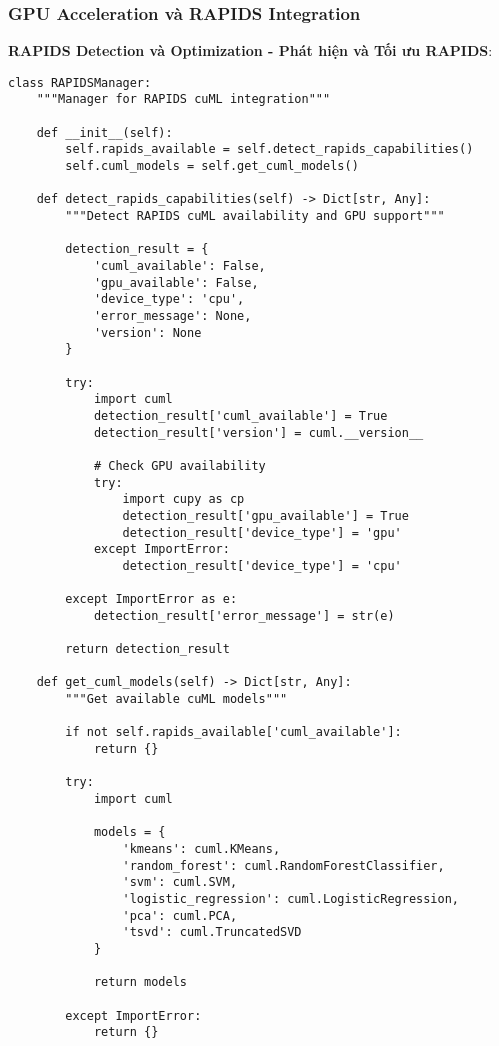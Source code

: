 \subsubsection{GPU Acceleration và RAPIDS Integration}

\textbf{RAPIDS Detection và Optimization - Phát hiện và Tối ưu RAPIDS}:

\begin{verbatim}
class RAPIDSManager:
    """Manager for RAPIDS cuML integration"""
    
    def __init__(self):
        self.rapids_available = self.detect_rapids_capabilities()
        self.cuml_models = self.get_cuml_models()
        
    def detect_rapids_capabilities(self) -> Dict[str, Any]:
        """Detect RAPIDS cuML availability and GPU support"""
        
        detection_result = {
            'cuml_available': False,
            'gpu_available': False,
            'device_type': 'cpu',
            'error_message': None,
            'version': None
        }
        
        try:
            import cuml
            detection_result['cuml_available'] = True
            detection_result['version'] = cuml.__version__
            
            # Check GPU availability
            try:
                import cupy as cp
                detection_result['gpu_available'] = True
                detection_result['device_type'] = 'gpu'
            except ImportError:
                detection_result['device_type'] = 'cpu'
                
        except ImportError as e:
            detection_result['error_message'] = str(e)
            
        return detection_result
        
    def get_cuml_models(self) -> Dict[str, Any]:
        """Get available cuML models"""
        
        if not self.rapids_available['cuml_available']:
            return {}
            
        try:
            import cuml
            
            models = {
                'kmeans': cuml.KMeans,
                'random_forest': cuml.RandomForestClassifier,
                'svm': cuml.SVM,
                'logistic_regression': cuml.LogisticRegression,
                'pca': cuml.PCA,
                'tsvd': cuml.TruncatedSVD
            }
            
            return models
            
        except ImportError:
            return {}
\end{verbatim}

